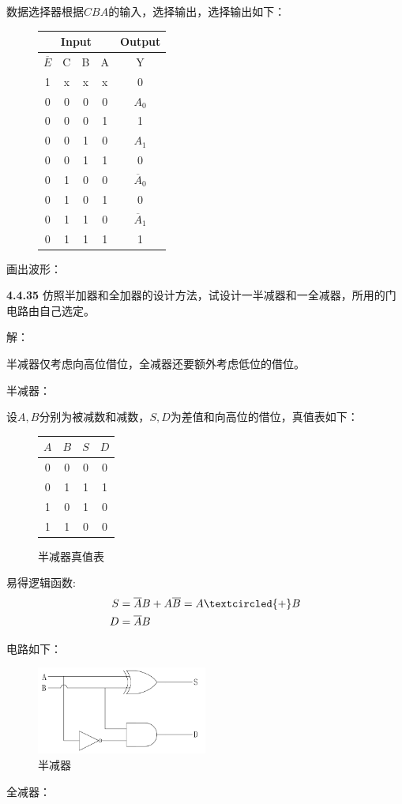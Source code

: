 \documentclass[a4paper,11pt,UTF8]{article}
\begin{document}
数据选择器根据$CBA$的输入，选择输出，选择输出如下：
\begin{figure}[H]
	\centering
	\begin{tabular}{cccc|c}
		\hline
		\multicolumn{4}{c|}{Input} & Output\\
		\hline
		$\overline{E}$ & C & B & A & Y\\
		\hline
		1 & x & x & x & 0\\
		0 & 0 & 0 & 0 & $A_0$\\
		0 & 0 & 0 & 1 & 1\\
		0 & 0 & 1 & 0 & $A_1$\\
		0 & 0 & 1 & 1 & 0\\
		0 & 1 & 0 & 0 & $\overline{A}_0$\\
		0 & 1 & 0 & 1 & 0\\
		0 & 1 & 1 & 0 & $\overline{A}_1$\\
		0 & 1 & 1 & 1 & 1\\
		\hline
	\end{tabular}
\end{figure}

画出波形：

\textbf{4.4.35} 仿照半加器和全加器的设计方法，试设计一半减器和一全减器，所用的门电路由自己选定。

解：

半减器仅考虑向高位借位，全减器还要额外考虑低位的借位。

半减器：

设$A,B$分别为被减数和减数，$S,D$为差值和向高位的借位，真值表如下：
\begin{figure}[H]
	\centering
	\begin{tabular}{cc|cc}
		\hline
		$A$ & $B$ & $S$ & $D$\\
		\hline
		0 & 0 & 0 & 0 \\
		0 & 1 & 1 & 1 \\
		1 & 0 & 1 & 0 \\
		1 & 1 & 0 & 0 \\
		\hline
	\end{tabular}
	\caption{半减器真值表}
\end{figure}
易得逻辑函数:
\begin{align*}
	S&=\overline{A}B+A\overline{B}=A\textcircled{+}B\\
	D&=\overline{A}B
\end{align*}

电路如下：
\begin{figure}[H]
	\centering
	\includegraphics[width=0.5\textwidth]{4.4.35_1}
	\caption{半减器}
\end{figure}
全减器：
\end{document}
